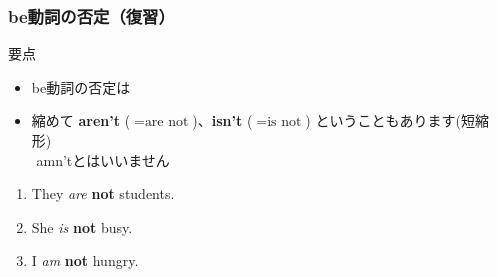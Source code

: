\documentclass[aspectratio=169,xcolor={dvipsnames,table}]{beamer}
\begin{document}
\begin{frame}[plain]\frametitle{be動詞の否定（復習）}
\begin{block}{要点}
\begin{itemize}[square]
 \item<2->  be動詞の否定は\,\,
 \item<4->  縮めて {\bfseries aren't} ($=\text{are not}$)、{\bfseries isn't} ($=\text{is not}$) ということもあります\hfill{}{\scriptsize (短縮形)}\,\,\\
\hfill{{\scriptsize \dbend\,\,amn'tとはいいません\,\,\,}}
\end{itemize}
\hfill\begin{minipage}{.75\textwidth}
\begin{enumerate}
 \item<3-> They {\itshape are} {\bfseries not} students. 
 \item<3-> She {\itshape is} {\bfseries not} busy. 
 \item<3-> I {\itshape am} {\bfseries not} hungry. 
\end{enumerate}
\end{minipage}
\end{block}
\end{frame}
\end{document}
